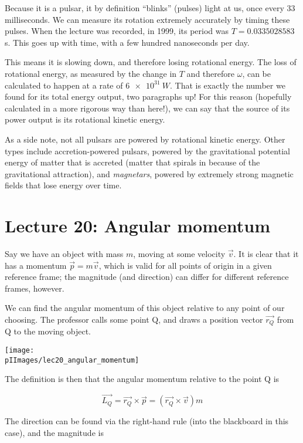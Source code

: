 Because it is a pulsar, it by definition ``blinks'' (pulses) light at us, once every 33 milliseconds. We can measure its rotation extremely accurately by timing these pulses. When the lecture was recorded, in 1999, its period was $T = 0.0335028583$ s. This goes up with time, with a few hundred nanoseconds per day.

This means it is slowing down, and therefore losing rotational energy. The loss of rotational energy, as measured by the change in $T$ and therefore $\omega$, can be calculated to happen at a rate of $\SI{6e31}{W}$. That is exactly the number we found for its total energy output, two paragraphs up! For this reason (hopefully calculated in a more rigorous way than here!), we can say that the source of its power output is its rotational kinetic energy.

As a side note, not all pulsars are powered by rotational kinetic energy. Other types include accretion-powered pulsars, powered by the gravitational potential energy of matter that is accreted (matter that spirals in because of the gravitational attraction), and \emph{magnetars}, powered by extremely strong magnetic fields that lose energy over time.

\section{Lecture 20: Angular momentum}

Say we have an object with mass $m$, moving at some velocity $\vec{v}$. It is clear that it has a momentum $\vec{p} = m \vec{v}$, which is valid for all points of origin in a given reference frame; the magnitude (and direction) can differ for different reference frames, however.

We can find the angular momentum of this object relative to any point of our choosing. The professor calls some point Q, and draws a position vector $\vec{r_Q}$ from Q to the moving object.

\begin{center}
\texttt{[image: \\pIImages/lec20\_angular\_momentum]}
\end{center}

The definition is then that the angular momentum relative to the point Q is

\begin{equation}
\vec{L_Q} = \vec{r_Q} \times \vec{p} = (\vec{r_Q} \times \vec{v}) m
\end{equation}

The direction can be found via the right-hand rule (into the blackboard in this case), and the magnitude is

